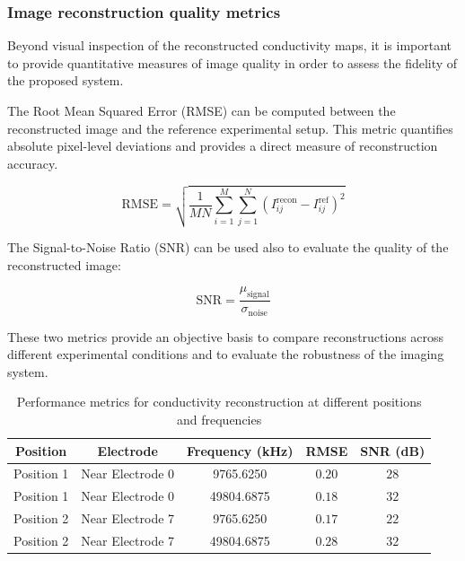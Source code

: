 \subsubsection{Image reconstruction quality metrics}

Beyond visual inspection of the reconstructed conductivity maps, it is important to provide quantitative measures of image quality in order to assess the fidelity of the proposed system.

The Root Mean Squared Error (RMSE) can be computed between the reconstructed image and the reference experimental setup. This metric quantifies absolute pixel-level deviations and provides a direct measure of reconstruction accuracy\cite{adler2006uses}.

\begin{equation}
\text{RMSE} = \sqrt{\frac{1}{MN}\sum_{i=1}^{M}\sum_{j=1}^{N} \left(I_{ij}^{\text{recon}} - I_{ij}^{\text{ref}}\right)^2}
\end{equation}

The Signal-to-Noise Ratio (SNR) can be used also to evaluate the quality of the reconstructed image\cite{haase1991magnetic}:

\begin{equation}
\text{SNR} = \frac{\mu_{\text{signal}}}{\sigma_{\text{noise}}}
\end{equation}

These two metrics provide an objective basis to compare reconstructions across different experimental conditions and to evaluate the robustness of the imaging system.




\begin{table}[H]
\centering
\caption{Performance metrics for conductivity reconstruction at different positions and frequencies}
\label{tab:performance_metrics}
\begin{tabular}{|c|c|c|c|c|}
\hline
\textbf{Position} & \textbf{Electrode} & \textbf{Frequency (kHz)} & \textbf{RMSE} & \textbf{SNR (dB)} \\
\hline
Position 1 & Near Electrode 0 & 9765.6250 & $0.20$ & $28$ \\
\hline
Position 1 & Near Electrode 0 & 49804.6875 & $0.18$ & $32$ \\
\hline
Position 2 & Near Electrode 7 & 9765.6250 & $0.17$ & $22$ \\
\hline
Position 2 & Near Electrode 7 & 49804.6875 & $0.28$ & $32$ \\
\hline
\end{tabular}
\end{table}


